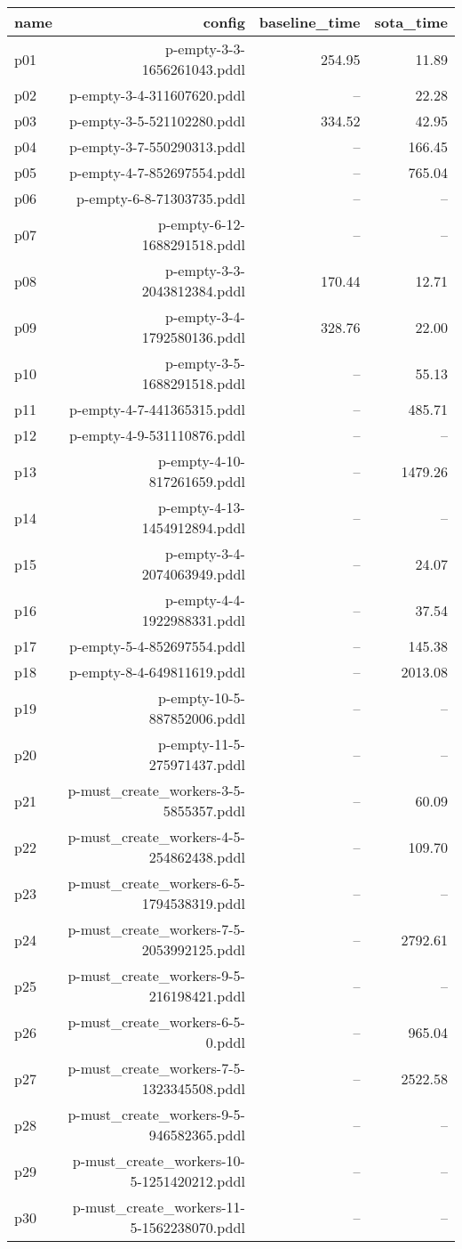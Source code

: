 \documentclass{article}
\begin{document}
                            \begin{center}
                            \scriptsize
                            \begin{tabular}{@{}l|r|r|r@{}}
                            name & config & baseline\_time & sota\_time\\\midrule
                              p01& p-empty-3-3-1656261043.pddl&254.95&11.89\\
  p02& p-empty-3-4-311607620.pddl&--&22.28\\
  p03& p-empty-3-5-521102280.pddl&334.52&42.95\\
  p04& p-empty-3-7-550290313.pddl&--&166.45\\
  p05& p-empty-4-7-852697554.pddl&--&765.04\\
  p06& p-empty-6-8-71303735.pddl&--&--\\
  p07& p-empty-6-12-1688291518.pddl&--&--\\
  p08& p-empty-3-3-2043812384.pddl&170.44&12.71\\
  p09& p-empty-3-4-1792580136.pddl&328.76&22.00\\
  p10& p-empty-3-5-1688291518.pddl&--&55.13\\
  p11& p-empty-4-7-441365315.pddl&--&485.71\\
  p12& p-empty-4-9-531110876.pddl&--&--\\
  p13& p-empty-4-10-817261659.pddl&--&1479.26\\
  p14& p-empty-4-13-1454912894.pddl&--&--\\
  p15& p-empty-3-4-2074063949.pddl&--&24.07\\
  p16& p-empty-4-4-1922988331.pddl&--&37.54\\
  p17& p-empty-5-4-852697554.pddl&--&145.38\\
  p18& p-empty-8-4-649811619.pddl&--&2013.08\\
  p19& p-empty-10-5-887852006.pddl&--&--\\
  p20& p-empty-11-5-275971437.pddl&--&--\\
  p21& p-must\_create\_workers-3-5-5855357.pddl&--&60.09\\
  p22& p-must\_create\_workers-4-5-254862438.pddl&--&109.70\\
  p23& p-must\_create\_workers-6-5-1794538319.pddl&--&--\\
  p24& p-must\_create\_workers-7-5-2053992125.pddl&--&2792.61\\
  p25& p-must\_create\_workers-9-5-216198421.pddl&--&--\\
  p26& p-must\_create\_workers-6-5-0.pddl&--&965.04\\
  p27& p-must\_create\_workers-7-5-1323345508.pddl&--&2522.58\\
  p28& p-must\_create\_workers-9-5-946582365.pddl&--&--\\
  p29& p-must\_create\_workers-10-5-1251420212.pddl&--&--\\
  p30& p-must\_create\_workers-11-5-1562238070.pddl&--&--
                            \end{tabular}
                            \end{center}
                    
\end{document}
